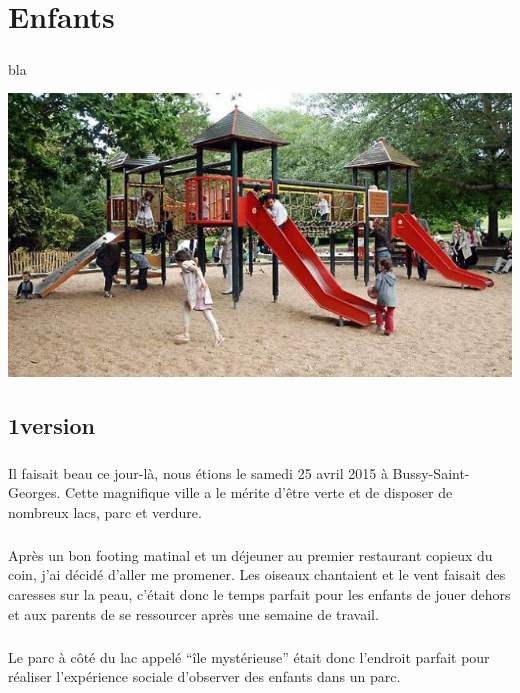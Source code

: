 \chapter{Enfants}

\paragraph{}
bla

\begin{center}
	\includegraphics[scale=0.7]{enfants.jpg}
\end{center}

\section{1\iere version}

\paragraph{} Il faisait beau ce jour-là, nous étions le samedi 25 avril 2015 à
Bussy-Saint-Georges. Cette magnifique ville a le mérite d'être verte et de
disposer de nombreux lacs, parc et verdure.

\paragraph{} Après un bon footing matinal et un déjeuner au premier restaurant
copieux du coin, j'ai décidé d'aller me promener. Les oiseaux chantaient et le
vent faisait des caresses sur la peau, c'était donc le temps parfait pour les
enfants de jouer dehors et aux parents de se ressourcer après une semaine de
travail.

\paragraph{} Le parc à côté du lac appelé ``île mystérieuse'' était donc
l'endroit parfait pour réaliser l'expérience sociale d'observer des enfants
dans un parc.

